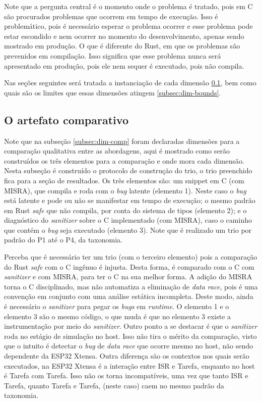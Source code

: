 Note que a pergunta central é o momento onde o problema é tratado, pois em C são procurados problemas que ocorrem em tempo de execução. Isso é problemático, pois é necessário esperar o problema ocorrer e esse problema pode estar escondido e nem ocorrer no momento do desenvolvimento, apenas sendo mostrado em produção. O que é diferente do Rust, em que os problemas são prevenidos em compilação. Isso significa que esse problema nunca será apresentado em produção, pois ele nem sequer é executado, pois não compila.

Nas seções seguintes será tratada a instanciação de cada dimensão \ref{subsec:dim-inst}, bem como quais são os limites que essas dimensões atingem \ref{subsec:dim-bounds}.

\subsection{O artefato comparativo}
\label{subsec:dim-inst}

Note que na subseção \ref{subsec:dim-comp} foram declaradas dimensões para a comparação qualitativa entre as abordagens, aqui é mostrado como serão construídos os três elementos para a comparação e onde mora cada dimensão. Nesta subseção é construído o protocolo de construção do trio, o trio preenchido fica para a seção de resultados. Os três elementos são: um snippet em C (com \ac{MISRA}), que compila e roda com o \textit{bug} latente (elemento 1). Neste caso o \textit{bug} está latente e pode ou não se manifestar em tempo de execução; o mesmo padrão em Rust \textit{safe} que não compila, por conta do sistema de tipos (elemento 2); e o diagnóstico do \textit{sanitizer} sobre o C implementado (com \ac{MISRA}), caso o caminho que contém o \textit{bug} seja executado (elemento 3). Note que é realizado um trio por padrão do P1 até o P4, da taxonomia.

Perceba que é necessário ter um trio (com o terceiro elemento) pois a comparação do Rust \textit{safe} com o C ingênuo é injusta. Desta forma, é comparado com o C com \textit{sanitizer} e com \ac{MISRA}, para ter o C na sua melhor forma. A adição do \ac{MISRA} torna o C disciplinado, mas não automatiza a eliminação de \textit{data race}, pois é uma convenção em conjunto com uma análise estática incompleta. Deste modo, ainda é necessário o \textit{sanitizer} para pegar os \textit{bugs} em \textit{runtime}. O elemento 1 e o elemento 3 são o mesmo código, o que muda é que no elemento 3 existe a instrumentação por meio do \textit{sanitizer}. Outro ponto a se destacar é que o \textit{sanitizer} roda no estágio de simulação no host. Isso não tira o mérito da comparação, visto que o intuito é detectar o \textit{bug} de \textit{data race} que ocorre mesmo no host, não sendo dependente da ESP32 Xtensa. Outra diferença são os contextos nos quais serão executados, na ESP32 Xtensa é a interação entre \ac{ISR} e Tarefa, enquanto no host é Tarefa com Tarefa. Isso não os torna incompatíveis, uma vez que tanto \ac{ISR} e Tarefa, quanto Tarefa e Tarefa, (neste caso) caem no mesmo padrão da taxonomia.

